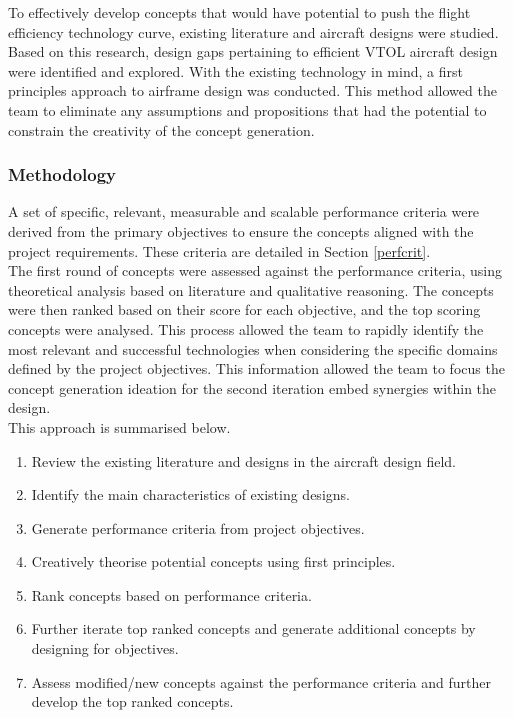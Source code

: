 To effectively develop concepts that would have potential to push the flight efficiency technology curve, existing literature and aircraft designs were studied. Based on this research, design gaps pertaining to efficient VTOL aircraft design were identified and explored. With the existing technology in mind, a first principles approach to airframe design was conducted. This method allowed the team to eliminate any assumptions and propositions that had the potential to constrain the creativity of the concept generation.

\subsubsection{Methodology}

A set of specific, relevant, measurable and scalable performance criteria were derived from the primary objectives to ensure the concepts aligned with the project requirements. These criteria are detailed in Section \ref{perfcrit}.\\

The first round of concepts were assessed against the performance criteria, using theoretical analysis based on literature and qualitative reasoning. The concepts were then ranked based on their score for each objective, and the top scoring concepts were analysed. This process allowed the team to rapidly identify the most relevant and successful technologies when considering the specific domains defined by the project objectives. This information allowed the team to focus the concept generation ideation for the second iteration embed synergies within the design.\\

This approach is summarised below.
\begin{enumerate}
    \item Review the existing literature and designs in the aircraft design field.
    \item Identify the main characteristics of existing designs.
    \item Generate performance criteria from project objectives.
    \item Creatively theorise potential concepts using first principles.
    \item Rank concepts based on performance criteria.
    \item Further iterate top ranked concepts and generate additional concepts by designing for objectives.
    \item Assess modified/new concepts against the performance criteria and further develop the top ranked concepts.
\end{enumerate}

